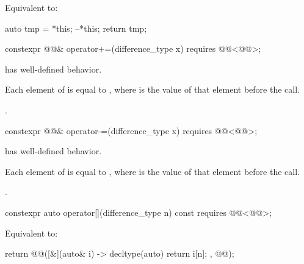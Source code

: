 \begin{itemdescr}
\pnum
\effects
Equivalent to:
\begin{codeblock}
auto tmp = *this;
--*this;
return tmp;
\end{codeblock}
\end{itemdescr}

%
\begin{itemdecl}
constexpr @@& operator+=(difference_type x)
  requires @@<@@>;
\end{itemdecl}

\begin{itemdescr}
\pnum
\expects
{} has well-defined behavior.

\pnum
\ensures
Each element of  is equal to ,
where  is the value of that element before the call.

\pnum
\returns
{}.
\end{itemdescr}

%
\begin{itemdecl}
constexpr @@& operator-=(difference_type x)
  requires @@<@@>;
\end{itemdecl}

\begin{itemdescr}
\pnum
\expects
{} has well-defined behavior.

\pnum
\ensures
Each element of  is equal to ,
where  is the value of that element before the call.

\pnum
\returns
{}.
\end{itemdescr}

%
\begin{itemdecl}
constexpr auto operator[](difference_type n) const
  requires @@<@@>;
\end{itemdecl}

\begin{itemdescr}
\pnum
\effects
Equivalent to:
\begin{codeblock}
return @@([&](auto& i) -> decltype(auto) { return i[n]; }, @@);
\end{codeblock}
\end{itemdescr}


